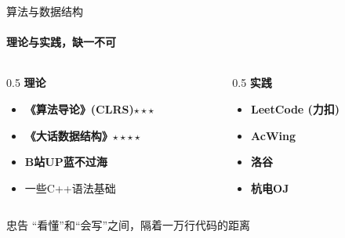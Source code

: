 \documentclass{beamer}
\begin{document}
\begin{frame}{算法与数据结构}
    \framesubtitle{理论与实践，缺一不可}
    
    \begin{columns}[T]
        \begin{column}{0.5\textwidth}
            \Large\textbf{理论}
            \vspace{0.3cm}
            
            \begin{itemize}
                \item \textbf{《算法导论》(CLRS)$\star \star \star$}
                \item \textbf{《大话数据结构》$\star \star \star \star$}
                \item \textbf{B站UP蓝不过海}
                \item 一些C++语法基础
            \end{itemize}
        \end{column}
        
        \begin{column}{0.5\textwidth}
            \Large\textbf{实践}
            \vspace{0.3cm}
            
            \begin{itemize}
                \item  \textbf{LeetCode (力扣)} \\
                \item \textbf{AcWing} \\
                \item  \textbf{洛谷} \\
                \item \textbf{杭电OJ} \\
            \end{itemize}
        \end{column}
    \end{columns}

    \begin{alertblock}{忠告}
        “看懂”和“会写”之间，隔着一万行代码的距离
    \end{alertblock}
\end{frame}
\end{document}
